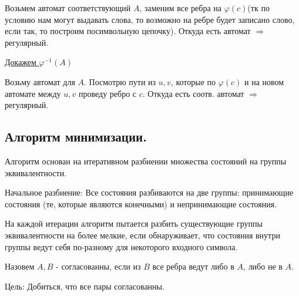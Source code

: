 Возьмем автомат соответствующий $A$, заменим все ребра на $\varphi(c)$(тк по условию нам могут выдавать слова, то возможно на ребре будет записано слово, если так, то построим посимвольную цепочку). Откуда есть автомат $\Rightarrow$ регулярный.

\uline{Докажем $\varphi^{-1}(A)$}

Возьму автомат для $A$. Посмотрю пути из $u,v$, которые по $\varphi(c)$ и на новом автомате между $u,v$ проведу ребро с $c$. Откуда есть соотв. автомат $\Rightarrow$ регулярный.

\subsection{Алгоритм минимизации.}


Алгоритм основан на итеративном разбиении множества состояний на группы эквивалентности.

Начальное разбиение: Все состояния разбиваются на две группы: принимающие состояния (те, которые являются конечными) и непринимающие состояния.

На каждой итерации алгоритм пытается разбить существующие группы эквивалентности на более мелкие, если обнаруживает, что состояния внутри группы ведут себя по-разному для некоторого входного символа.

Назовем $A,B$ - согласованны, если из $B$ все ребра ведут либо в $A$, либо не в $A$.

Цель: Добиться, что все пары согласованны.  
